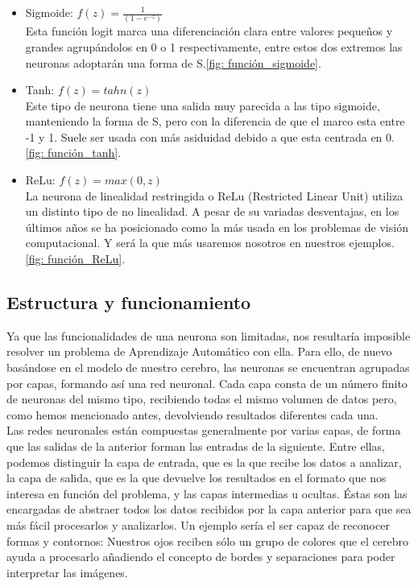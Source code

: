 \begin{itemize}
    \item Sigmoide: $f(z) = \frac{1}{(1-e^{-z})}$\\
    Esta función logit marca una diferenciación clara entre valores pequeños y grandes agrupándolos en 0 o 1 respectivamente, entre estos dos extremos las neuronas adoptarán una forma de S.\ref{fig: función_sigmoide}.

%

    \item Tanh: $f(z)= tahn(z)$\\
    Este tipo de neurona tiene una salida muy parecida a las tipo sigmoide, manteniendo la forma de S, pero con la diferencia de que el marco esta entre -1 y 1. Suele ser usada con más asiduidad debido a que esta centrada en 0.\ref{fig: función_tanh}.

%

    \item ReLu: $f(z) = max(0,z)$\\
    La neurona de linealidad restringida o ReLu (Restricted Linear Unit) utiliza un distinto tipo de no linealidad. A pesar de su variadas desventajas, en los últimos años se ha posicionado como la más usada en los problemas de visión computacional. Y será la que más usaremos nosotros en nuestros ejemplos.\ref{fig: función_ReLu}.

%

\end{itemize}

\subsection{Estructura y funcionamiento}
Ya que las funcionalidades de una neurona son limitadas, nos resultaría imposible resolver un problema de Aprendizaje Automático con ella. Para ello, de nuevo basándose en el modelo de nuestro cerebro, las neuronas se encuentran agrupadas por capas, formando así una red neuronal. Cada capa consta de un número finito de neuronas del mismo tipo, recibiendo todas el mismo volumen de datos pero, como hemos mencionado antes, devolviendo resultados diferentes cada una. \\

Las redes neuronales están compuestas generalmente por varias capas, de forma que las salidas de la anterior forman las entradas de la siguiente. Entre ellas, podemos distinguir la capa de entrada, que es la que recibe los datos a analizar, la capa de salida, que es la que devuelve los resultados en el formato que nos interesa en función del problema, y las capas intermedias u ocultas. Éstas son las encargadas de abstraer todos los datos recibidos por la capa anterior para que sea más fácil procesarlos y analizarlos. Un ejemplo sería el ser capaz de reconocer formas y contornos: Nuestros ojos reciben sólo un grupo de colores que el cerebro ayuda a procesarlo añadiendo el concepto de bordes y separaciones para poder interpretar las imágenes. \\

